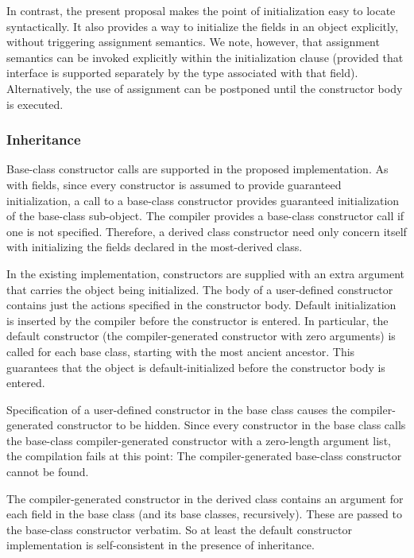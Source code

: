 In contrast, the present proposal makes the point of initialization
easy to locate syntactically.  It also provides a way to initialize the fields
in an object explicitly, without triggering assignment semantics.  
We note, however, that assignment semantics can be invoked explicitly within the
initialization clause (provided that interface is supported separately by the
type associated with that field).  Alternatively, the use of assignment can be
postponed until the constructor body is executed.

\subsubsection{Inheritance}

Base-class constructor calls are supported in the proposed implementation.  
As with fields, since every constructor is assumed to provide guaranteed initialization, a call
to a base-class constructor provides guaranteed initialization of the base-class
sub-object.  The compiler provides a base-class constructor call if one is not
specified.  Therefore, a derived class constructor need only concern itself with
initializing the fields declared in the most-derived class.

In the existing implementation, constructors are supplied with an extra 
argument that carries the object being initialized.  The body of a user-defined
constructor contains just the
actions specified in the constructor body.  Default initialization is inserted
by the compiler before the constructor is entered.  In particular, the default
constructor (the compiler-generated constructor with zero arguments) is called
for each base class, starting with the most ancient ancestor.  This guarantees
that the object is default-initialized before the constructor body is entered.

Specification of a user-defined constructor in the base class causes the
compiler-generated constructor to be hidden.  Since every constructor in the
base class calls the base-class compiler-generated constructor with a
zero-length argument list, the compilation fails at this point: The
compiler-generated base-class constructor cannot be found.

The compiler-generated constructor in the derived class contains an argument for
each field in the base class (and its base classes, recursively).  These are
passed to the base-class constructor verbatim.  So at least the default
constructor implementation is self-consistent in the presence of inheritance.

